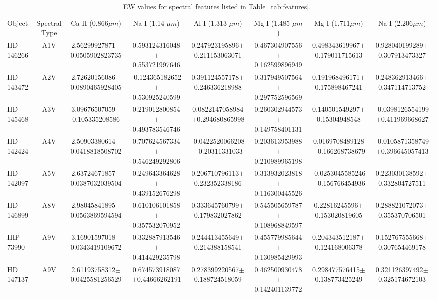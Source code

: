 \begin{table}
\begin{center}
\caption{EW values for spectral features listed in Table~\ref{tab:features}.~\label{tab:EWvals}}
\begin{tabular}{l|c|c|c|c|c|c|c}
Object & Spectral Type & Ca II (0.866$\mu m$) & Na I (1.14 $\mu m$) & Al I (1.313 $\mu m$) & Mg I (1.485 $\mu m$) & Mg I (1.711$\mu m$) & Na I (2.206$\mu m$) \\
HD 146266 & A1V & 2.56299927871$\pm$0.0505902823735 & 0.593124316048$\pm$0.553721997646 & 0.247923195896$\pm$0.211153063071 & 0.467304907556$\pm$0.162599896949 & 0.498343619967$\pm$0.179011715613 & 0.928040199289$\pm$0.307913473327 \\
HD 143472 & A2V & 2.72620156086$\pm$0.0890465928405 & -0.124365182652$\pm$0.530925240599 & 0.391124557178$\pm$0.246336218988 & 0.317949507564$\pm$0.297752596569 & 0.191968496171$\pm$0.175898467241 & 0.248362913466$\pm$0.347114713752 \\
HD 145468 & A3V & 3.09676507059$\pm$0.105335208586 & 0.219012800854$\pm$0.493783546746 & 0.0822147058984$\pm$0.294680865998 & 0.260302944573$\pm$0.149758401131 & 0.140501549297$\pm$0.15304948548 & -0.0398126554199$\pm$0.411969668627 \\
HD 142424 & A4V & 2.50903380614$\pm$0.0418818508702 & 0.707624567334$\pm$0.546249292806 & -0.0422520066208$\pm$0.20311331033 & 0.203613953988$\pm$0.210989965198 & 0.0169708489128$\pm$0.166268738679 & -0.0105871358749$\pm$0.396645057413 \\
HD 142097 & A5V & 2.63724671857$\pm$0.0387032039504 & 0.249643364628$\pm$0.439152676298 & 0.206710796113$\pm$0.232352338186 & 0.313932023818$\pm$0.116300445526 & -0.0253045585246$\pm$0.156766454936 & 0.223030138592$\pm$0.332804727511 \\
HD 146899 & A8V & 2.98045841895$\pm$0.0563869594594 & 0.610106101858$\pm$0.357532070952 & 0.333645760799$\pm$0.179832027862 & 0.545505659787$\pm$0.108968849597 & 0.22816245596$\pm$0.153020819605 & 0.288821072073$\pm$0.355370706501 \\
HIP 73990 & A9V & 3.16901597018$\pm$0.0343419109672 & 0.332887913546$\pm$0.414429235798 & 0.244413455649$\pm$0.214388158541 & 0.455779985644$\pm$0.130985429993 & 0.204343512187$\pm$0.124168006378 & 0.152767555668$\pm$0.307654469178 \\
HD 147137 & A9V & 2.61193758312$\pm$0.0425581256529 & 0.674573918087$\pm$0.44666262191 & 0.278399220567$\pm$0.188724518059 & 0.462500930478$\pm$0.142401139772 & 0.298477576415$\pm$0.138773425249 & 0.321126397492$\pm$0.325174672103 \\

\end{tabular}
\end{center}
\end{table}
